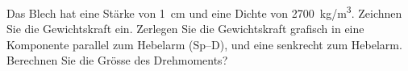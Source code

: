 \begin{aufgabe}
	Das Blech hat eine Stärke von \SI{1}{cm} und eine Dichte von \SI{2700}{kg/m^3}.
	Zeichnen Sie die Gewichtskraft ein. Zerlegen Sie die Gewichtskraft grafisch in eine Komponente parallel zum Hebelarm (Sp--D),
	und eine senkrecht zum Hebelarm.
	Berechnen Sie die Grösse des Drehmoments?

	\begin{center}
	\end{center}

\end{aufgabe}


